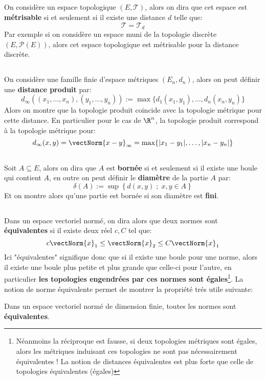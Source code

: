 \subsection*{}
On considère un espace topologique \((E, \mathcal{T})\), alors on dira que cet espace est \textbf{métrisable} si et seulement si il existe une distance \(d\) telle que:
\[
   \mathcal{T} = \mathcal{T}_d
\]
Par exemple si on considère un espace muni de la topologie discrète \((E, \mathcal{P}(E))\), alors cet espace topologique est métrisable pour la distance discrète.
\subsection*{}
On considère une famille finie d'espace métriques \((E_n, d_n)\), alors on peut définir une \textbf{distance produit} par:
\[
   d_\infty((x_1, \ldots, x_n), (y_1, \ldots, y_n)) := \max\{d_1(x_1, y_1), \ldots, d_n(x_n, y_n)\}
\]
Alors on montre que la topologie produit coincide avec la topologie métrique pour cette distance. En particulier pour le cas de \(\R^n\), la topologie produit correspond à la topologie métrique pour:
\[
   d_\infty(x, y) = \vectNorm{x - y}_\infty = \max\{|x_1 - y_1|, \ldots, |x_n - y_n|\}
\]
\subsection*{}
Soit \( A \subseteq E\), alors on dira que \( A \) est \textbf{bornée} si et seulement si il existe une boule qui contient \( A \), en outre on peut définir le \textbf{diamètre} de la partie \( A \) par:
\[ 
   \delta(A) := \sup \left\{ d(x, y) \; ; \; x, y \in A \right\}  
\]
Et on montre alors qu'une partie est bornée si son diamètre est \textbf{fini}.
\subsection*{}
Dans un espace vectoriel normé, on dira alors que deux normes sont \textbf{équivalentes} si il existe deux réel \(c, C\) tel que:
\[
   c\vectNorm{x}_1 \leq \vectNorm{x}_2 \leq C\vectNorm{x}_1
\]
Ici "équivalentes" signifique donc que si il existe une boule pour une norme, alors il existe une boule plus petite et plus grande que celle-ci pour l'autre, en particulier \textbf{les topologies engendrées par ces normes sont égales}\footnote[1]{Néanmoins la réciproque est fausse, si deux topologies métriques sont égales, alors les métriques induisant ces topologies ne sont pas nécessairement équivalentes ! La notion de distances équivalentes est plus forte que celle de topologies équivalentes (égales)}.\+
La notion de norme équivalente permet de montrer la propriété trés utile suivante:
\begin{center}
   Dans un espace vectoriel normé de dimension finie, toutes les normes sont \textbf{équivalentes}.
\end{center}
